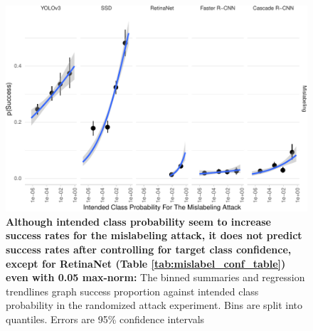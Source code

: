 \begin{figure}[tb]

{\centering \includegraphics{imgs/mislabel_conf_graph-1} 

}

\caption{\textbf{Although intended class probability seem to increase success rates for the mislabeling attack, it does not predict success rates after controlling for target class confidence, except for RetinaNet (Table \ref{tab:mislabel_conf_table}) even with 0.05 max-norm:}  The binned summaries and regression trendlines graph success proportion against intended class probability in the randomized attack experiment. Bins are split into quantiles. Errors are 95\% confidence intervals}\label{fig:mislabel_conf_graph}
\end{figure}

\begingroup\fontsize{9}{11}\selectfont

